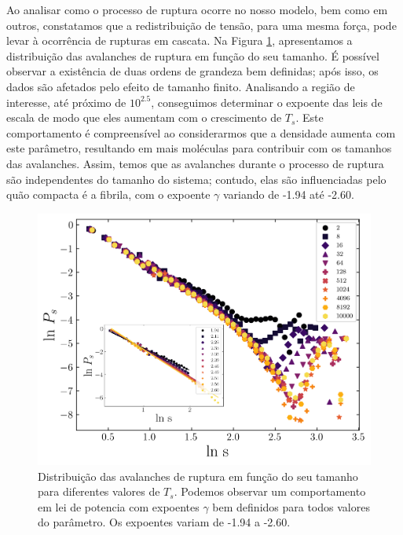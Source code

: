 \documentclass{article}
\begin{document}
    Ao analisar como o processo de ruptura ocorre no nosso modelo, bem como em outros, constatamos que a 
    redistribuição de tensão, para uma mesma força, pode levar à ocorrência de rupturas em cascata. Na Figura 
    \ref{R7}, apresentamos a distribuição das avalanches de ruptura em função do seu tamanho. É possível observar a 
    existência de duas ordens de grandeza bem definidas; após isso, os dados são afetados pelo efeito de tamanho 
    finito. Analisando a região de interesse, até próximo de \(10^{2.5}\), conseguimos determinar o expoente das leis 
    de escala de modo que eles aumentam com o crescimento de \(T_{s}\). Este comportamento é compreensível ao 
    considerarmos que a densidade aumenta com este parâmetro, resultando em mais moléculas para contribuir com os 
    tamanhos das avalanches. Assim, temos que as avalanches durante o processo de ruptura são independentes do tamanho 
    do sistema; contudo, elas são influenciadas pelo quão compacta é a fibrila, com o expoente \(\gamma\) variando de 
    -1.94 até -2.60. 


    \begin{figure}[H]
        \centering
        \includegraphics[width=\textwidth]{figures/ava.png}

        \caption{Distribuição das avalanches de ruptura em função do seu tamanho para diferentes valores de \(T_{s}\).
        Podemos observar um comportamento em lei de potencia com expoentes $\gamma$ bem definidos para todos valores do 
        parâmetro. Os expoentes variam de -1.94 a -2.60.} 

        \label{R7}

    \end{figure}
\end{document}
